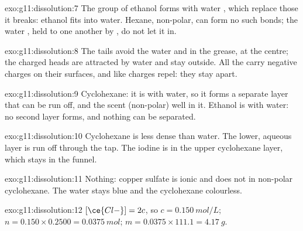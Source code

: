 \begin{solution}{exo:g11:dissolution:7}
The  group of ethanol forms  with water ,
which replace those it breaks: ethanol fits into water. Hexane, non-polar,
can form no such bonds; the water , held to one another by
, do not let it in.
\end{solution}

\begin{solution}{exo:g11:dissolution:8}
The  tails avoid the water and  in the grease, at the
centre; the charged heads are attracted by water and stay outside. All
the  carry negative charges on their surfaces, and like charges
repel: they stay apart.
\end{solution}

\begin{solution}{exo:g11:dissolution:9}
Cyclohexane: it is  with water, so it forms a separate layer
that can be run off, and the scent (non-polar)  well in it.
Ethanol is  with water: no second layer forms, and nothing can be
separated.
\end{solution}

\begin{solution}{exo:g11:dissolution:10}
Cyclohexane is less dense than water. The lower, aqueous layer is run
off through the tap. The iodine is in the upper cyclohexane layer, which
stays in the funnel.
\end{solution}

\begin{solution}{exo:g11:dissolution:11}
Nothing: copper sulfate is ionic and does not  in non-polar
cyclohexane. The water stays blue and the cyclohexane colourless.
\end{solution}

\begin{solution}{exo:g11:dissolution:12}
$[\ce{Cl-}] = 2c$, so $c = \qty{0.150}{mol/L}$;
$n = 0.150 \times 0.2500 = \qty{0.0375}{mol}$;
$m = 0.0375 \times 111.1 = \qty{4.17}{g}$.
\end{solution}

